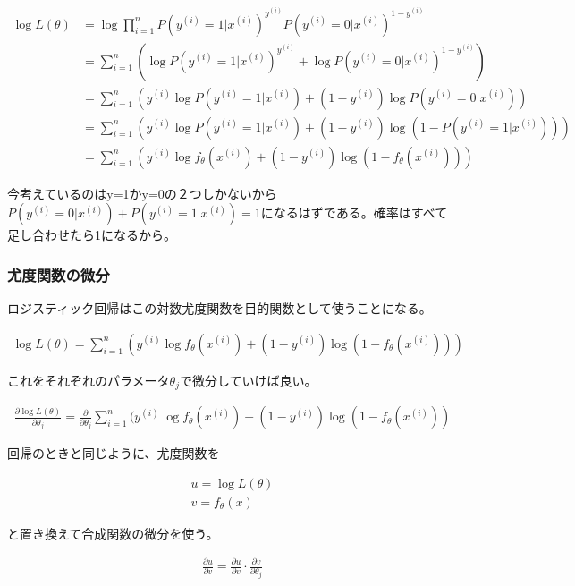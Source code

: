 \documentclass{jsarticle}
\begin{document}
\begin{align}
	\log L(\theta) &= \log \prod_{i=1}^{n} P(y^{(i)} = 1|x^{(i)})^{y^{(i)}} P(y^{(i)} = 0|x^{(i)})^{1-y^{(i)}} \\
    &= \sum_{i=1}^{n} (\log P(y^{(i)} = 1|x^{(i)})^{y^{(i)}} + \log P(y^{(i)} = 0|x^{(i)})^{1-y^{(i)}}) \\
    &= \sum_{i=1}^{n} ( {y^{(i)}} \log P(y^{(i)} = 1|x^{(i)}) + (1-y^{(i)}) \log P(y^{(i)} = 0|x^{(i)})) \\
    &= \sum_{i=1}^{n} ( {y^{(i)}} \log P(y^{(i)} = 1|x^{(i)}) + (1-y^{(i)}) \log (1-P(y^{(i)} = 1|x^{(i)}))) \\
    &= \sum_{i=1}^{n} (y^{(i)} \log f_\theta(x^{(i)}) + (1-y^{(i)}) \log (1-f_\theta(x^{(i)})))
\end{align}

今考えているのはy=1かy=0の２つしかないから$P(y^{(i)} = 0|x^{(i)}) + P(y^{(i)} = 1|x^{(i)}) = 1$になるはずである。確率はすべて足し合わせたら1になるから。

\subsubsection{尤度関数の微分}
ロジスティック回帰はこの対数尤度関数を目的関数として使うことになる。

\begin{align}
	\log L(\theta) = \sum_{i=1}^{n} (y^{(i)} \log f_\theta(x^{(i)}) + (1-y^{(i)}) \log (1-f_\theta(x^{(i)})))
 \end{align}

これをそれぞれのパラメータ$\theta_j$で微分していけば良い。

\begin{align}
	\frac{\partial \log L(\theta)}{\partial \theta_j} = \frac{\partial}{\partial \theta_j} \sum_{i=1}^{n} (y^{(i)} \log f_\theta(x^{(i)}) + (1-y^{(i)}) \log (1-f_\theta(x^{(i)}))
\end{align}

回帰のときと同じように、尤度関数を

\begin{align}
	u = \log L(\theta) \\
    v = f_\theta(x)
\end{align}

と置き換えて合成関数の微分を使う。

\begin{align}
	\frac{\partial u}{\partial v} = \frac{\partial u}{\partial v} \cdot \frac{\partial v}{\partial \theta_j}
\end{align}
\end{document}

